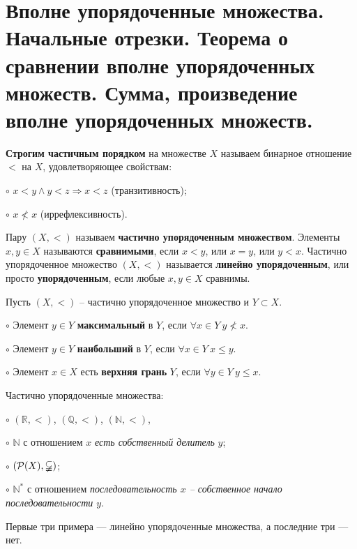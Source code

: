 \section{Вполне упорядоченные множества. Начальные отрезки. Теорема о сравнении вполне упорядоченных множеств.
Сумма, произведение вполне упорядоченных множеств.}

\begin{definition}
	\textbf{Строгим частичным порядком} на множестве $X$ называем бинарное отношение $<$ на $X$, удовлетворяющее
	свойствам:

	$\circ$ $x < y \land y<z \Rightarrow x<z$ (транзитивность);

	$\circ$ $x \not< x$ (иррефлексивность).

	Пару $(X, <)$ называем \textbf{частично упорядоченным множеством}. Элементы $x, y \in X$ называются
	\textbf{сравнимыми}, если $x < y$, или $x = y$, или $y < x$. Частично упорядоченное множество $(X, <)$
	называется \textbf{линейно упорядоченным}, или просто \textbf{упорядоченным}, если любые $x, y \in X$ сравнимы.

	Пусть $(X, <)$ -- частично упорядоченное множество и $Y \subset X$. 

	$\circ$ Элемент $y \in Y$ \textbf{максимальный} в $Y$, если $\forall x \in Y \ y \not< x$.

	$\circ$ Элемент $y \in Y$ \textbf{наибольший} в $Y$, если $\forall x \in Y \ x \leqslant y$.

	$\circ$ Элемент $x \in X$ есть \textbf{верхняя грань} $Y$, если $\forall y \in Y \ y \leqslant x$.
\end{definition}

\begin{example}
	Частично упорядоченные множества:

	$\circ$ $(\mathbb{R}, <)$, $(\mathbb{Q}, <)$, $(\mathbb{N}, <)$,

	$\circ$ $\mathbb{N}$ с отношением $x$ \textit{есть собственный делитель} $y$;

	$\circ$ $(\mathcal{P}(X), \varsubsetneqq)$;

	$\circ$ $\mathbb{N}^{*}$ с отношением \textit{последовательность $x$ -- собственное начало последовательности $y$}.

	Первые три примера — линейно упорядоченные множества, а последние три — нет.
\end{example}

